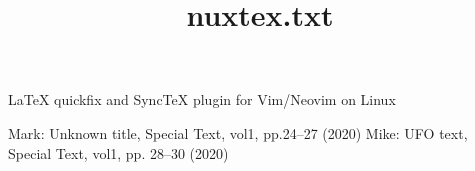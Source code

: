\documentclass[a4,12pt]{ujarticle}
\begin{document}
\title{nuxtex.txt}
\maketitle
\noindent
\begin{center}
LaTeX quickfix and SyncTeX plugin for Vim/Neovim on Linux
\end{center}


%
%









\begin{thebibliography}{99}
Mark: Unknown title, Special Text, vol1, pp.24--27 (2020)
Mike: UFO text, Special Text, vol1, pp. 28--30 (2020)
\end{thebibliography}
\begin{thebibliography}{9}
\end{thebibliography}
\end{document}
